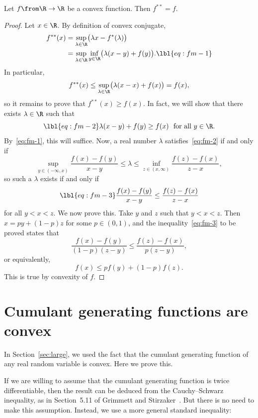 \begin{thmlf}%
%
%
Let $f \from \R \to \R$ be a convex function.  Then $f^{**} = f$.
\end{thmlf}

\begin{proof}
Let $x \in \R$.  By definition of convex conjugate,
% 
\begin{align}
f^{**}(x)       &
=
\sup_{\lambda \in \R}\bigl(\lambda x - f^*(\lambda)\bigr) 
\nonumber       \\
&
=
\sup_{\lambda \in \R} \inf_{y \in \R} 
\bigl(\lambda(x - y) + f(y)\bigr).
\lbl{eq:fm-1}
\end{align}
% 
In particular,
\[
f^{**}(x)
\leq
\sup_{\lambda \in \R} \bigl(
\lambda(x - x) + f(x)
\bigr)
=
f(x),
\]
so it remains to prove that $f^{**}(x) \geq f(x)$.  In fact, we will show
that there exists $\lambda \in \R$ such that
% 
\begin{equation}
\lbl{eq:fm-2}
\lambda(x - y) + f(y) \geq f(x) 
\ \text{ for all } y \in \R.
\end{equation}
% 
By~\eqref{eq:fm-1}, this will suffice.  Now, a real number $\lambda$
satisfies~\eqref{eq:fm-2} if and only if
\[
\sup_{y \in (-\infty, x)} \frac{f(x) - f(y)}{x - y}
\leq
\lambda
\leq
\inf_{z \in (x, \infty)} \frac{f(z) - f(x)}{z - x},
\]
so such a $\lambda$ exists if and only if
% 
\begin{equation}
\lbl{eq:fm-3}
\frac{f(x) - f(y)}{x - y}
\leq
\frac{f(z) - f(x)}{z - x}
\end{equation}
% 
for all $y < x < z$.  We now prove this.  Take $y$ and $z$ such that $y < x
< z$.  Then $x = py + (1 - p)z$ for some $p \in (0, 1)$, and the
inequality~\eqref{eq:fm-3} to be proved states that
\[
\frac{f(x) - f(y)}{(1 - p)(z - y)}
\leq
\frac{f(z) - f(x)}{p(z - y)},
\]
or equivalently,
\[
f(x) \leq pf(y) + (1 - p)f(z).
\]
This is true by convexity of $f$.
\end{proof}


\section{Cumulant generating functions are convex}


In Section~\ref{sec:large}, we used the fact that the cumulant generating
function of any real random variable is convex.  Here we prove this.  

If we are willing to assume that the cumulant generating function is twice
differentiable, then the result can be deduced from the Cauchy--Schwarz
inequality, as in Section~5.11 of Grimmett and Stirzaker~\cite{GrSt}.  But
there is no need to make this assumption.  Instead, we use a more general
standard inequality:

